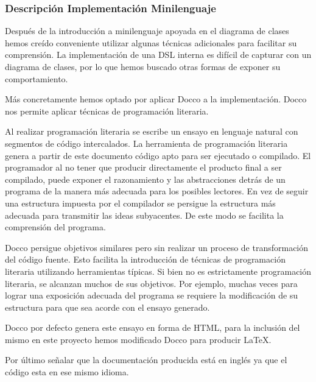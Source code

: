 \subsubsection{Descripción Implementación Minilenguaje}

Después de la introducción a minilenguaje apoyada en el diagrama de
clases hemos creído conveniente utilizar algunas técnicas adicionales
para facilitar su comprensión. La implementación de una DSL interna es
difícil de capturar con un diagrama de clases, por lo que hemos
buscado otras formas de exponer su comportamiento.

Más concretamente hemos optado por aplicar Docco\cite{DOCCO} a la
implementación. Docco nos permite aplicar técnicas de programación
literaria\cite{LITERATE_PROGRAMMING}.

Al realizar programación literaria se escribe un ensayo en lenguaje
natural con segmentos de código intercalados. La herramienta de
programación literaria genera a partir de este documento código apto
para ser ejecutado o compilado. El programador al no tener que
producir directamente el producto final a ser compilado, puede exponer
el razonamiento y las abstracciones detrás de un programa de la manera
más adecuada para los posibles lectores. En vez de seguir una
estructura impuesta por el compilador se persigue la estructura más
adecuada para transmitir las ideas subyacentes.  De este modo se
facilita la comprensión del programa.

Docco persigue objetivos similares pero sin realizar un proceso de
transformación del código fuente. Esto facilita la introducción de
técnicas de programación literaria utilizando herramientas típicas. Si
bien no es estrictamente programación literaria, se alcanzan muchos de
sus objetivos. Por ejemplo, muchas veces para lograr una exposición
adecuada del programa se requiere la modificación de su estructura
para que sea acorde con el ensayo generado.

Docco por defecto genera este ensayo en forma de HTML, para la
inclusión del mismo en este proyecto hemos modificado Docco para
producir \LaTeX{}\cite{DOCCOTEX}.

Por último señalar que la documentación producida está en inglés ya
que el código esta en ese mismo idioma.

\begin{landscape}
\begingroup
    \fontsize{9pt}{11pt}\selectfont
    
\endgroup
\end{landscape}

